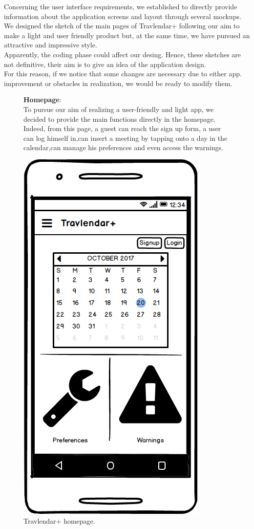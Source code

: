 
	\begin{flushleft}
		Concerning the user interface requirements, we established to directly provide information about the application screens and layout through several mockups. \\
		We designed the sketch of the main pages of Travlendar+ following our aim to make a light and user friendly product but, at the same time, we have pursued an attractive and impressive style. \\
		Apparently, the coding phase could affect our desing. Hence, these sketches are not definitive, their aim is to give an idea of the application design. \\
		For this reason, if we notice that some changes are necessary due to either app. improvement or obstacles in realization, we would be ready to modify them. 
	\end{flushleft}
\clearpage

	\begin{figure}
			\begin{flushleft}
			\textbf{Homepage}:\\
			To pursue our aim of realizing a user-friendly and light app, we decided to provide the main functions directly in the homepage. Indeed, from this page, a guest can reach the sign up form, a user can log himself in,can insert a meeting by tapping onto a day in the calendar,can manage his preferences and even access the warnings. \\ 
		\end{flushleft}
		\centering
		\includegraphics[width=0.6\linewidth]{mockups/Homepage}
		\caption{Travlendar+ homepage.  
		}
	\label{fig:homepage}
	\end{figure}

